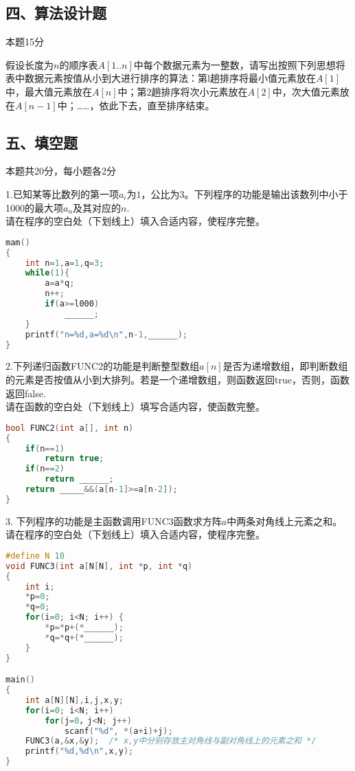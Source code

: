 \subsection{四、算法设计题}

本题15分

  假设长度为$n$的顺序表$A[1..n]$中每个数据元素为一整数，请写出按照下列思想将表中数据元素按值从小到大进行排序的算法：第l趟排序将最小值元素放在$A[1]$中，最大值元素放在$A[n]$中；第$2$趟排序将次小元素放在$A[2]$中，次大值元素放在$A[n-1]$中；……，依此下去，直至排序结束。


\subsection{五、填空题}

本题共20分，每小题各2分

1.已知某等比数列的第一项$a_i$为$1$，公比为$3$。下列程序的功能是输出该数列中小于1000的最大项$a_n$及其对应的$n$. \\
请在程序的空白处（下划线上）填入合适内容，使程序完整。
\begin{lstlisting}[language=cpp]
mam()
{
    int n=1,a=1,q=3;
    while(1){
        a=a*q;
        n++;
        if(a>=l000)
            ______;
    }
    printf("n=%d,a=%d\n",n-1,______);
}
\end{lstlisting}

2.下列递归函数FUNC2的功能是判断整型数组$a[n]$是否为递增数组，即判断数组的元素是否按值从小到大排列。若是一个递增数组，则函数返回true，否则，函数返回false. \\
请在函数的空白处（下划线上）填写合适内容，使函数完整。
\begin{lstlisting}[language=cpp]
bool FUNC2(int a[], int n)
{
    if(n==1)
        return true;
    if(n==2)
        return ______;
    return _____&&(a[n-1]>=a[n-2]);
}


\end{lstlisting}

3. 下列程序的功能是主函数调用FUNC3函数求方阵$a$中两条对角线上元紊之和。 \\
请在程序的空白处（下划线上）填入合适内容，使程序完整。
\begin{lstlisting}[language=cpp]
#define N 10
void FUNC3(int a[N[N], int *p, int *q)
{
    int i;
    *p=0;
    *q=0;
    for(i=0; i<N; i++) {
        *p=*p+(*______);
        *q=*q+(*______);
    }
}

main()
{
    int a[N][N],i,j,x,y;
    for(i=0; i<N; i++)
        for(j=0，j<N; j++)
            scanf("%d", *(a+i)+j);
    FUNC3(a,&x,&y);  /* x,y中分别存放主对角线与副对角线上的元素之和 */
    printf("%d,%d\n",x,y);
}
\end{lstlisting}

